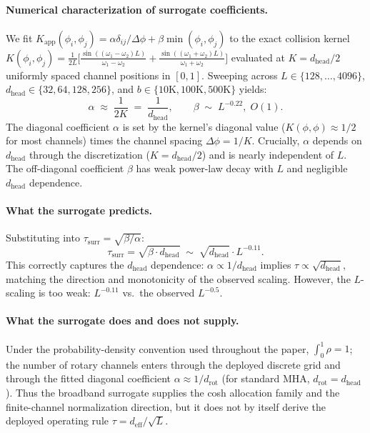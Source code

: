 \paragraph{Numerical characterization of surrogate coefficients.}
We fit $K_{\mathrm{app}}(\phi_i,\phi_j) = \alpha\delta_{ij}/\Delta\phi + \beta\min(\phi_i,\phi_j)$ to the exact collision kernel $K(\phi_i,\phi_j) = \frac{1}{2L}\bigl[\frac{\sin((\omega_1{-}\omega_2)L)}{\omega_1{-}\omega_2} + \frac{\sin((\omega_1{+}\omega_2)L)}{\omega_1{+}\omega_2}\bigr]$ evaluated at $K = d_{\mathrm{head}}/2$ uniformly spaced channel positions in $[0,1]$. Sweeping across $L \in \{128,\ldots,4096\}$, $d_{\mathrm{head}} \in \{32,64,128,256\}$, and $b \in \{10\mathrm{K}, 100\mathrm{K}, 500\mathrm{K}\}$ yields:
\begin{equation}
\alpha \;\approx\; \frac{1}{2K} \;=\; \frac{1}{d_{\mathrm{head}}},
\qquad
\beta \;\sim\; L^{-0.22},\; O(1).
\end{equation}
The diagonal coefficient $\alpha$ is set by the kernel's diagonal value ($K(\phi,\phi) \approx 1/2$ for most channels) times the channel spacing $\Delta\phi = 1/K$. Crucially, $\alpha$ depends on $d_{\mathrm{head}}$ through the discretization ($K = d_{\mathrm{head}}/2$) and is nearly independent of $L$. The off-diagonal coefficient $\beta$ has weak power-law decay with $L$ and negligible $d_{\mathrm{head}}$ dependence.

\paragraph{What the surrogate predicts.}
Substituting into $\tau_{\mathrm{surr}} = \sqrt{\beta/\alpha}$:
\begin{equation}
\tau_{\mathrm{surr}} = \sqrt{\beta \cdot d_{\mathrm{head}}} \;\sim\; \sqrt{d_{\mathrm{head}}} \cdot L^{-0.11}.
\end{equation}
This correctly captures the $d_{\mathrm{head}}$ dependence: $\alpha \propto 1/d_{\mathrm{head}}$ implies $\tau \propto \sqrt{d_{\mathrm{head}}}$, matching the direction and monotonicity of the observed scaling. However, the $L$-scaling is too weak: $L^{-0.11}$ vs.\ the observed $L^{-0.5}$.

\paragraph{What the surrogate does and does not supply.}
Under the probability-density convention used throughout the paper, $\int_0^1\rho=1$; the number of rotary channels enters through the deployed discrete grid and through the fitted diagonal coefficient $\alpha\approx 1/d_{\mathrm{rot}}$ (for standard MHA, $d_{\mathrm{rot}}=d_{\mathrm{head}}$). Thus the broadband surrogate supplies the cosh allocation family and the finite-channel normalization direction, but it does not by itself derive the deployed operating rule $\tau=d_{\mathrm{eff}}/\sqrt{L}$.

